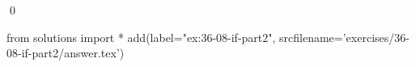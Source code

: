 
\begin{ex}
  \label{ex:36-08-if-part2}
  
  \qed
\end{ex}
\begin{python0}
from solutions import *
add(label="ex:36-08-if-part2",
    srcfilename='exercises/36-08-if-part2/answer.tex')
\end{python0}
